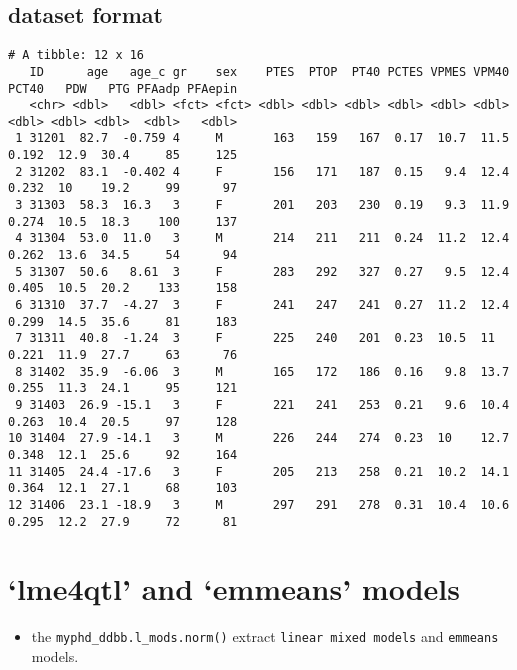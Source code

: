 \documentclass[
  10pt,
]{article}
\providecommand{\tightlist}{%
  \setlength{\itemsep}{0pt}\setlength{\parskip}{0pt}}
\begin{document}
\newpage

\hypertarget{dataset-format}{%
\subsection{dataset format}\label{dataset-format}}

\begin{verbatim}
# A tibble: 12 x 16
   ID      age   age_c gr    sex    PTES  PTOP  PT40 PCTES VPMES VPM40 PCT40   PDW   PTG PFAadp PFAepin
   <chr> <dbl>   <dbl> <fct> <fct> <dbl> <dbl> <dbl> <dbl> <dbl> <dbl> <dbl> <dbl> <dbl>  <dbl>   <dbl>
 1 31201  82.7  -0.759 4     M       163   159   167  0.17  10.7  11.5 0.192  12.9  30.4     85     125
 2 31202  83.1  -0.402 4     F       156   171   187  0.15   9.4  12.4 0.232  10    19.2     99      97
 3 31303  58.3  16.3   3     F       201   203   230  0.19   9.3  11.9 0.274  10.5  18.3    100     137
 4 31304  53.0  11.0   3     M       214   211   211  0.24  11.2  12.4 0.262  13.6  34.5     54      94
 5 31307  50.6   8.61  3     F       283   292   327  0.27   9.5  12.4 0.405  10.5  20.2    133     158
 6 31310  37.7  -4.27  3     F       241   247   241  0.27  11.2  12.4 0.299  14.5  35.6     81     183
 7 31311  40.8  -1.24  3     F       225   240   201  0.23  10.5  11   0.221  11.9  27.7     63      76
 8 31402  35.9  -6.06  3     M       165   172   186  0.16   9.8  13.7 0.255  11.3  24.1     95     121
 9 31403  26.9 -15.1   3     F       221   241   253  0.21   9.6  10.4 0.263  10.4  20.5     97     128
10 31404  27.9 -14.1   3     M       226   244   274  0.23  10    12.7 0.348  12.1  25.6     92     164
11 31405  24.4 -17.6   3     F       205   213   258  0.21  10.2  14.1 0.364  12.1  27.1     68     103
12 31406  23.1 -18.9   3     M       297   291   278  0.31  10.4  10.6 0.295  12.2  27.9     72      81
\end{verbatim}

\newpage

\hypertarget{lme4qtl-and-emmeans-models}{%
\section{`lme4qtl' and `emmeans'
models}\label{lme4qtl-and-emmeans-models}}

\begin{itemize}
\tightlist
\item
  the \texttt{myphd\_ddbb.l\_mods.norm()} extract
  \texttt{linear\ mixed\ models} and \texttt{emmeans} models.
\end{itemize}
\end{document}
